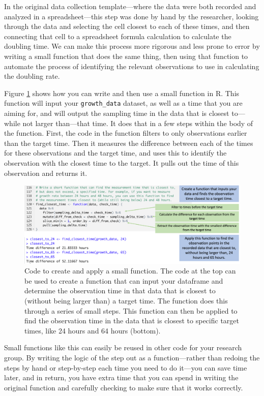 \documentclass[]{tufte-book}
\begin{document}
In the original data collection template---where the data were both recorded
and analyzed in a spreadsheet---this step was done by hand by the researcher,
looking through the data and selecting the cell closest to each of these
times, and then connecting that cell to a spreadsheet formula calculation
to calculate the doubling time. We can make this process more rigorous and
less prone to error by writing a small function that does the same thing,
then using that function to automate the process of identifying the
relevant observations to use in calculating the doubling rate.

Figure \ref{fig:growthfunction} shows how you can write and then use a small
function in R. This function will input your \texttt{growth\_data} dataset, as well as a
time that you are aiming for, and will output the sampling time in the data that
is closest to---while not larger than---that time. It does that in a few steps
within the body of the function. First, the code in the function filters to only
observations earlier than the target time. Then it measures the difference
between each of the times for these observations and the target time, and uses
this to identify the observation with the closest time to the target. It pulls
out the time of this observation and returns it.

\begin{figure}
\includegraphics[width=\textwidth]{figures/growth_curve_function} \caption[Code to create and apply a small function]{Code to create and apply a small function. The code at the top can be used to create a function that can input your dataframe and determine the observation time in that data that is closest to (without being larger than) a target time. The function does this through a series of small steps. This function can then be applied to find the observation time in the data that is closest to specific target times, like 24 hours and 64 hours (bottom).}\label{fig:growthfunction}
\end{figure}

Small functions like this can easily be reused in other code for your research
group. By writing the logic of the step out as a function---rather than redoing
the steps by hand or step-by-step each time you need to do it---you can save
time later, and in return, you have extra time that you can spend in writing
the original function and carefully checking to make sure that it works
correctly.
\end{document}
